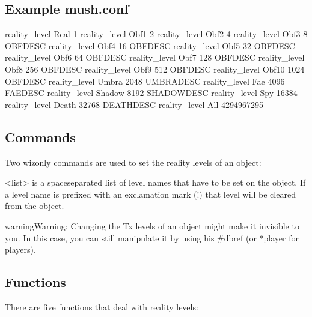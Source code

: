 \documentclass[letterpaper,10pt,english]{sphinxmanual}
\begin{document}
\subsection{Example mush.conf}
\label{\detokenize{advanced:example-mush-conf}}
\sphinxAtStartPar
reality\_level Real 1
reality\_level Obf1 2
reality\_level Obf2 4
reality\_level Obf3 8 OBFDESC
reality\_level Obf4 16 OBFDESC
reality\_level Obf5 32 OBFDESC
reality\_level Obf6 64 OBFDESC
reality\_level Obf7 128 OBFDESC
reality\_level Obf8 256 OBFDESC
reality\_level Obf9 512 OBFDESC
reality\_level Obf10 1024 OBFDESC
reality\_level Umbra 2048 UMBRADESC
reality\_level Fae 4096 FAEDESC
reality\_level Shadow 8192 SHADOWDESC
reality\_level Spy 16384
reality\_level Death 32768 DEATHDESC
reality\_level All 4294967295


\subsection{Commands}
\label{\detokenize{advanced:commands}}
\sphinxAtStartPar
Two wiz\sphinxhyphen{}only commands are used to set the reality levels of an object:

\begin{sphinxVerbatim}[commandchars=\\\{\}]
 
 
\end{sphinxVerbatim}

\sphinxAtStartPar
\textless{}list\textgreater{} is a space\sphinxhyphen{}separated list of level names that have to be set on the
object. If a level name is prefixed with an exclamation mark (!) that level
will be cleared from the object.

\begin{sphinxadmonition}{warning}{Warning:}
\sphinxAtStartPar
Changing the Tx levels of an object might make it invisible to you.
In this case, you can still manipulate it by using his \#dbref (or *player
for players).
\end{sphinxadmonition}


\subsection{Functions}
\label{\detokenize{advanced:functions}}
\sphinxAtStartPar
There are five functions that deal with reality levels:
\end{document}

